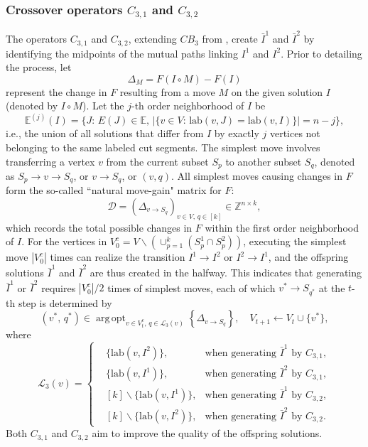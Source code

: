 \documentclass[12pt, a4paper]{article}%
\DeclareMathOperator*{\argopt}{\ensuremath{arg\,opt}}
\newcommand{\labeling}{\ensuremath{\mathrm{lab}}}
\numberwithin{equation}{section}
\theoremstyle{plain}
\begin{document}
\subsubsection{Crossover operators $C_{3,1}$ and $C_{3,2}$}
\label{sec::c4c5}


The operators $C_{3,1}$ and $C_{3,2}$, extending $CB_3$ from \cite{Marti2009}, create $\bar{I}^1$ and $\bar{I}^2$ by identifying the midpoints of the mutual paths linking $I^1$ and $I^2$. Prior to detailing the process, let 
\begin{equation}
	\label{delta::obj}
	\Delta_M=F(I\circ M)-F(I)
\end{equation}
represent the change in $F$ resulting from a move $M$ on the given solution $I$ (denoted by $I\circ M$). Let the $j$-th order neighborhood of $I$ be
\begin{equation}
	\mathbb{E}^{(j)}(I) = 
	\{J:\,E(J)\in\mathbb{E},\, |\{v\in V:\,\labeling(v,J)=\labeling(v, I)\}|=n-j\},
\end{equation}
i.e., the union of all solutions that differ from $I$ by exactly $j$ vertices not belonging to the same labeled cut segments.		
The simplest move involves transferring a vertex $v$ from the current subset $S_p$ to another subset $S_q$, denoted as $S_p\rightarrow v\rightarrow S_q$, or $v\rightarrow S_q$, or $(v,q)$. All simplest moves causing changes in $F$ form the so-called ``natural move-gain" matrix for $F$:
\begin{equation}
	\label{delta::dobj}
	\mathcal{D}=(\Delta_{v\rightarrow S_q})_{v\in V,\,q\in[k]}\in\mathbb{Z}^{n\times k},
\end{equation}
which records the total possible changes in $F$ within the first order neighborhood of $I$.
For the vertices in {${V}_0^c=V\backslash(\cup_{p=1}^k(S_p^1\cap S_p^2))$}, executing the simplest move $|{V}_0^c|$ times can realize the transition $I^1\rightarrow I^2$ or $I^2\rightarrow I^1$, and the offspring solutions $\bar{I}^1$ and $\bar{I}^2$ are thus created in the halfway. This indicates that generating $\bar{I}^1$ or $\bar{I}^2$ requires $|{V}_0^c|/2$ times of simplest moves, each of which $v^*\rightarrow S_{q^*}$ at the $t$-th step is determined by
\begin{equation}
	\label{path::cb3-1}
	(v^*,\,q^*)\in\argopt_{v\in {V}_t^c,\, q\in\mathcal{L}_3(v)}\left\{ \Delta_{v\rightarrow S_q} \right\},\quad {V}_{t+1}\leftarrow {V}_t\cup \{v^*\},
\end{equation}
where
$$\mathcal{L}_3(v)=
\left\{
\begin{aligned}
	& \{\labeling(v,I^2)\}, & \text{when generating } \bar{I}^1 \text{ by }  C_{3,1},\\
	& \{\labeling(v,I^1)\}, & \text{when generating } \bar{I}^2 \text{ by }  C_{3,1},\\
	& [k]\backslash\{\labeling(v,I^1)\},& \text{when generating } \bar{I}^1 \text{ by }  C_{3,2},\\
	&[k]\backslash\{\labeling(v,I^2)\},& \text{when generating } \bar{I}^2 \text{ by }  C_{3,2}.
\end{aligned}	
\right.
$$
Both $C_{3,1}$ and $C_{3,2}$ aim to improve the quality of the offspring solutions. 
\end{document}
